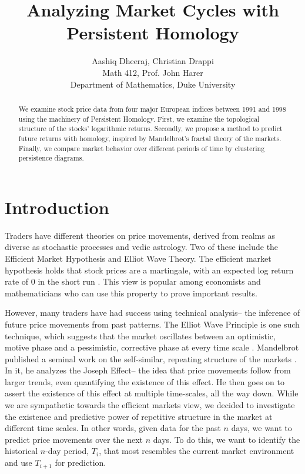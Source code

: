 \documentclass{article}
\title{Analyzing Market Cycles with Persistent Homology}
\author{
Aashiq Dheeraj, Christian Drappi \\
Math 412, Prof. John Harer \\
Department of Mathematics, Duke University
}
\begin{document}
\large

\maketitle

\begin{abstract}
We examine stock price data from four major European indices between 1991 and 1998 using the machinery of Persistent Homology. First, we examine the topological structure of the stocks’ logarithmic returns. Secondly, we propose a method to predict future returns with homology, inspired by Mandelbrot’s fractal theory of the markets. Finally, we compare market behavior over different periods of time by clustering persistence diagrams.
\end{abstract}

\newpage

\section{Introduction}
Traders have different theories on price movements, derived from realms as diverse as stochastic processes and vedic astrology. Two of these include the Efficient Market Hypothesis and Elliot Wave Theory. The efficient market hypothesis holds that stock prices are a martingale, with an expected log return rate of 0 in the short run \cite{samuelson1965}. This view is popular among economists and mathematicians who can use this property to prove important results. 

However, many traders have had success using technical analysis-- the inference of future price movements from past patterns. The Elliot Wave Principle is one such technique, which suggests that the market oscillates between an optimistic, motive phase and a pessimistic, corrective phase at every time scale \cite{frost2005}. Mandelbrot published a seminal work on the self-similar, repeating structure of the markets \cite{mandelbrot2005}. In it, he analyzes the Joseph Effect-- the idea that price movements follow from larger trends, even quantifying the existence of this effect. He then goes on to assert the existence of this effect at multiple time-scales, all the way down.  While we are sympathetic towards the efficient markets view, we decided to investigate the existence and predictive power of repetitive structure in the market at different time scales. In other words, given data for the past $n$ days, we want to predict price movements over the next $n$ days. To do this, we want to identify the historical $n$-day period, $T_i$,  that most resembles the current market environment and use $T_{i+1}$ for prediction.
\end{document}
